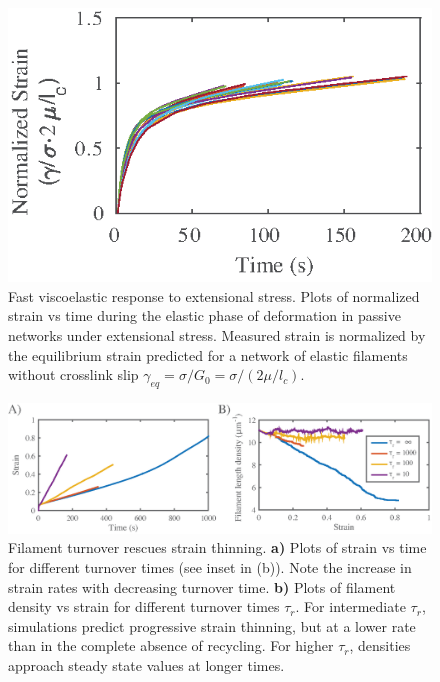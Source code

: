 \begin{figure}[H]
	\centering
	\includegraphics[width=\hsize]{active/figures/FigS1}
	\caption{\label{fig:passive_supp}  Fast viscoelastic response to extensional stress. Plots of normalized strain vs time during the elastic phase of deformation in passive networks under extensional stress.  Measured strain is normalized by the equilibrium strain predicted for a network of elastic filaments without crosslink slip $\gamma_{eq} = \sigma/G_0 = \sigma/(2\mu/l_c)$.  }
\end{figure}

\begin{figure}[H]
	\centering
	\includegraphics[width=\hsize]{active/figures/FigS2}
	\caption{\label{fig:thinning}  Filament turnover rescues strain thinning.  \textbf{a)} Plots of strain vs time for different turnover times (see inset in (b)). Note the increase in strain rates with decreasing turnover time. \textbf{b)} Plots of filament density vs strain for different turnover times $\tau_r$.  For intermediate $\tau_r$, simulations predict progressive strain thinning, but at a lower rate than in the complete absence of recycling. For higher $\tau_r$, densities approach steady state values at longer times.  }
\end{figure}

